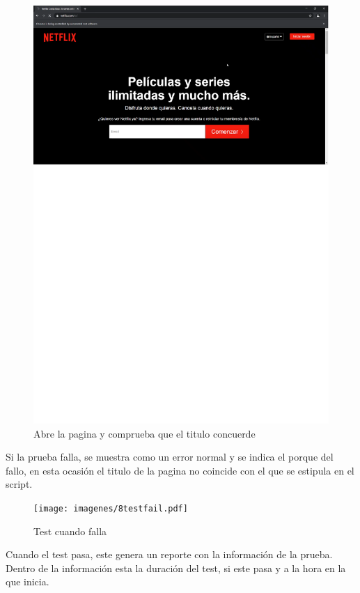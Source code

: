 \documentclass[conference]{IEEEtran}
\begin{document}
\begin{figure}[H]
\centering
\includegraphics[scale=0.47]{imagenes/7abrelapaginayconfirmanombre.pdf}
\caption{Abre la pagina y comprueba que el titulo concuerde}
\end{figure}

Si la prueba falla, se muestra como un error normal y se indica el porque del fallo, en esta ocasión el titulo de la pagina no coincide con el que se estipula en el script.

\begin{figure}[H]
\centering
\texttt{[image: imagenes/8testfail.pdf]}
\caption{Test cuando falla}
\end{figure}

Cuando el test pasa, este genera un reporte con la información de la prueba. Dentro de la información esta la duración del test, si este pasa y a la hora en la que inicia.
\end{document}
